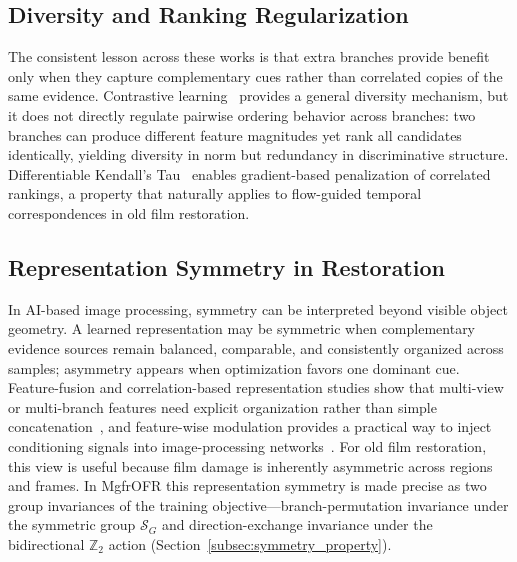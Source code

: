 \documentclass[symmetry,article,submit,pdftex,moreauthors]{Definitions/mdpi}
\begin{document}
\subsection{Diversity and Ranking Regularization}
\label{subsec:diversity_ranking}

The consistent lesson across these works is that extra branches provide benefit only when they capture complementary cues rather than correlated copies of the same evidence. Contrastive learning~\cite{chen2020mocov2} provides a general diversity mechanism, but it does not directly regulate pairwise ordering behavior across branches: two branches can produce different feature magnitudes yet rank all candidates identically, yielding diversity in norm but redundancy in discriminative structure. Differentiable Kendall's Tau~\cite{zheng2023diffkendall} enables gradient-based penalization of correlated rankings, a property that naturally applies to flow-guided temporal correspondences in old film restoration.

\subsection{Representation Symmetry in Restoration}
\label{subsec:symmetry_ai}

In AI-based image processing, symmetry can be interpreted beyond visible object geometry. A learned representation may be symmetric when complementary evidence sources remain balanced, comparable, and consistently organized across samples; asymmetry appears when optimization favors one dominant cue. Feature-fusion and correlation-based representation studies show that multi-view or multi-branch features need explicit organization rather than simple concatenation~\cite{yu2021multiview_tensor_fusion,qian2020multiview_matrix_correlation}, and feature-wise modulation provides a practical way to inject conditioning signals into image-processing networks~\cite{perez2018film}. For old film restoration, this view is useful because film damage is inherently asymmetric across regions and frames. In MgfrOFR this representation symmetry is made precise as two group invariances of the training objective---branch-permutation invariance under the symmetric group $\mathcal{S}_G$ and direction-exchange invariance under the bidirectional $\mathbb{Z}_2$ action (Section~\ref{subsec:symmetry_property}).
\end{document}
